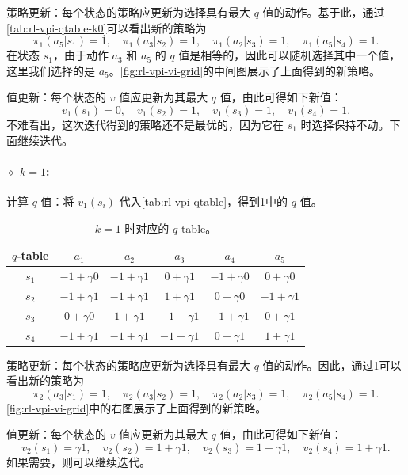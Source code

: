 策略更新：每个状态的策略应更新为选择具有最大 $q$ 值的动作。基于此，通过\cref{tab:rl-vpi-qtable-k0}可以看出新的策略为
$$
\pi_{1}(a_{5}|s_{1}) = 1, \quad \pi_{1}(a_{3}|s_{2}) = 1, \quad \pi_{1}(a_{2}|s_{3}) = 1, \quad \pi_{1}(a_{5}|s_{4}) = 1.
$$
在状态 $s_1$，由于动作 $a_3$ 和 $a_5$ 的 $q$ 值是相等的，因此可以随机选择其中一个值，这里我们选择的是 $a_5$。\cref{fig:rl-vpi-vi-grid}的中间图展示了上面得到的新策略。

值更新：每个状态的 $v$ 值应更新为其最大 $q$ 值，由此可得如下新值：
$$
v_{1}(s_{1}) = 0, \quad v_{1}(s_{2}) = 1, \quad v_{1}(s_{3}) = 1, \quad v_{1}(s_{4}) = 1.
$$
不难看出，这次迭代得到的策略还不是最优的，因为它在 $s_1$ 时选择保持不动。下面继续迭代。

\paragraph{$\diamond$ $k = 1$:}

计算 $q$ 值：将 $v_{1}(s_{i})$ 代入\cref{tab:rl-vpi-qtable}，得到\cref{tab:rl-vpi-qtable-k1}中的 $q$ 值。

\begin{table}[H]
\centering
\caption{$k = 1$ 时对应的 $q$-table。}
\label{tab:rl-vpi-qtable-k1}
\begin{tabular}{cccccc}
\toprule
$q$-table & $a_1$ & $a_2$ & $a_3$ & $a_4$ & $a_5$ \\
\midrule
$s_1$ & $-1+\gamma 0$ & $-1+\gamma 1$ & $0+\gamma 1$  & $-1+\gamma 0$ & $0+\gamma 0$  \\
$s_2$ & $-1+\gamma 1$ & $-1+\gamma 1$ & $1+\gamma 1$  & $0+\gamma 0$  & $-1+\gamma 1$ \\
$s_3$ & $0+\gamma 0$  & $1+\gamma 1$  & $-1+\gamma 1$ & $-1+\gamma 1$ & $0+\gamma 1$  \\
$s_4$ & $-1+\gamma 1$ & $-1+\gamma 1$ & $-1+\gamma 1$ & $0+\gamma 1$  & $1+\gamma 1$  \\
\bottomrule
\end{tabular}
\end{table}

策略更新：每个状态的策略应更新为选择具有最大 $q$ 值的动作。因此，通过\cref{tab:rl-vpi-qtable-k1}可以看出新的策略为
$$
\pi_{2}(a_{3}|s_{1}) = 1, \quad \pi_{2}(a_{3}|s_{2}) = 1, \quad \pi_{2}(a_{2}|s_{3}) = 1, \quad \pi_{2}(a_{5}|s_{4}) = 1.
$$
\cref{fig:rl-vpi-vi-grid}中的右图展示了上面得到的新策略。

值更新：每个状态的 $v$ 值应更新为其最大 $q$ 值，由此可得如下新值：
$$
v_{2}(s_{1}) = \gamma 1, \quad v_{2}(s_{2}) = 1 + \gamma 1, \quad v_{2}(s_{3}) = 1 + \gamma 1, \quad v_{2}(s_{4}) = 1 + \gamma 1.
$$
如果需要，则可以继续迭代。

